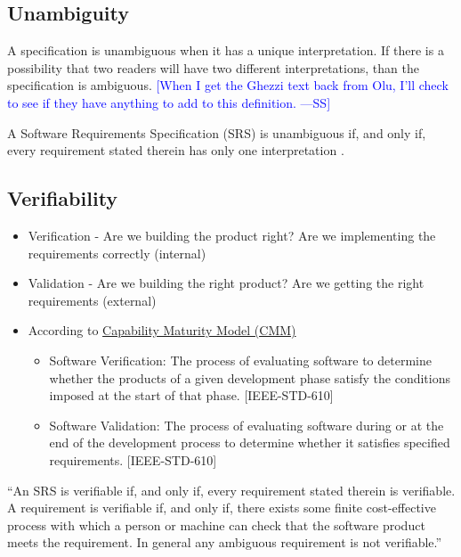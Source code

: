\documentclass[letterpaper,cleveref]{lipics-v2019}
\newcommand{\authornote}[3]{\textcolor{#1}{[#3 ---#2]}}
\newcommand{\authornote}[3]{}
\newcommand{\wss}[1]{\authornote{blue}{SS}{#1}} %
\theoremstyle{definition}
\begin{document}
\subsection{Unambiguity}

A specification is unambiguous when it has a unique interpretation.  If there is
a possibility that two readers will have two different interpretations, than the
specification is ambiguous.  \wss{When I get the Ghezzi text back from Olu, I'll
  check to see if they have anything to add to this definition.}

A Software Requirements Specification (SRS) is unambiguous if, and only if,
every requirement stated therein has only one interpretation \citep{IEEE1998}.

\subsection{Verifiability}

\begin{itemize}

\item Verification - Are we building the product right?  Are we implementing the
  requirements correctly (internal)
\item Validation - Are we building the right product? Are we getting the right
  requirements (external)
\item According to
  \href{https://en.wikipedia.org/wiki/Software_verification_and_validation}{Capability
    Maturity Model (CMM)}
\begin{itemize}
\item 
    Software Verification: The process of evaluating software to determine
    whether the products of a given development phase satisfy the conditions
    imposed at the start of that phase. [IEEE-STD-610]
  \item Software Validation: The process of evaluating software during or at the
    end of the development process to determine whether it satisfies specified
    requirements. [IEEE-STD-610] 
\end{itemize}
\end{itemize}

``An SRS is verifiable if, and only if, every requirement stated therein is
verifiable. A requirement is verifiable if, and only if, there exists some
finite cost-effective process with which a person or machine can check that the
software product meets the requirement. In general any ambiguous requirement is
not verifiable.'' \citep{IEEE1998}
\end{document}
